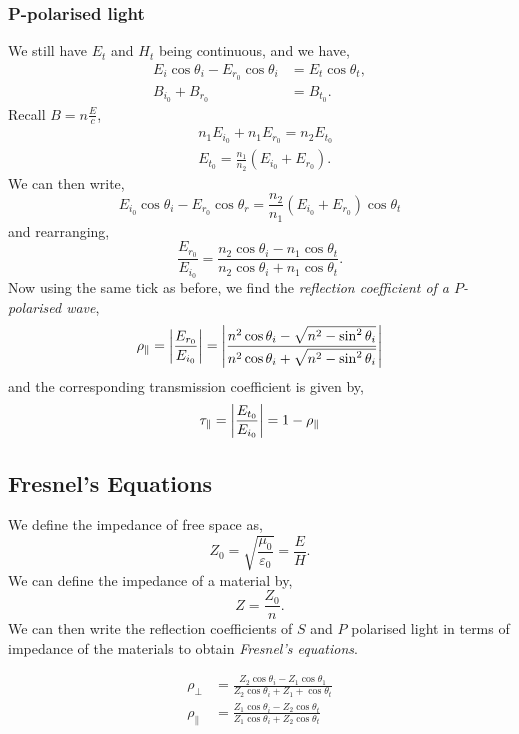 \documentclass{book}
\begin{document}
\subsubsection{P-polarised light}
We still have $E_t$ and $H_t$ being continuous, and we have,
\begin{align}
	E_i\cos\theta_i - E_{r_0}\cos\theta_i &= E_t\cos\theta_t, \\
	B_{i_0} + B_{r_0} &= B_{t_0}.
\end{align}
Recall $B = n \frac{E}{c}$, 
\begin{align}
	&n_1 E_{i_0} + n_1 E_{r_0} = n_2E_{t_0} \\
	&E_{t_0} = \frac{n_1}{n_2}(E_{i_0} + E_{r_0}).
\end{align}
We can then write,
\begin{equation}
	E_{i_0} \cos\theta_i - E_{r_0}\cos\theta_r = \frac{n_2}{n_1}(E_{i_0} + E_{r_0})\cos\theta_t
\end{equation}
and rearranging,
\begin{equation}
	\frac{E_{r_0}}{E_{i_0}} = \frac{n_2\cos\theta_i - n_1\cos\theta_t}{n_2\cos\theta_i + n_1\cos\theta_t}.
\end{equation}
Now using the same tick as before, we find the \textit{reflection coefficient of a $P$-polarised wave},
\begin{equation}
	\rho_{\parallel} = \abs{\frac{E_{r_0}}{E_{i_0}}} = \abs{\frac{n^2\cos\theta_i - \sqrt{n^2 - \sin^2\theta_i}}{n^2\cos\theta_i + \sqrt{n^2 - \sin^2\theta_i}}}
\end{equation}
and the corresponding transmission coefficient is given by,
\begin{equation}
	\tau_{\parallel} = \abs{\frac{E_{t_0}}{E_{i_0}}} = 1 - \rho_{\parallel}
\end{equation}
\subsection{Fresnel's Equations}
We define the impedance of free space as,
\begin{equation}
	Z_0 = \sqrt{\frac{\mu_0}{\varepsilon_0}} = \frac{E}{H}.
\end{equation}
We can define the impedance of a material by,
\begin{equation}
	Z = \frac{Z_0}{n}.
\end{equation}
We can then write the reflection coefficients of $S$ and $P$ polarised light in terms of impedance of the materials to obtain \textit{Fresnel's equations}.
\begin{tcolorbox}[title=Fresnel Equations]
	\begin{align}
	\rho_{\perp} & = \frac{Z_2\cos\theta_i - Z_1 \cos\theta_1}{Z_2 \cos\theta_i + Z_1 + \cos\theta_t} \\
	\rho_{\parallel} & = \frac{Z_1\cos\theta_i - Z_2 \cos\theta_t}{Z_1\cos\theta_i + Z_2\cos\theta_t}
	\end{align}
\end{tcolorbox}
\end{document}
